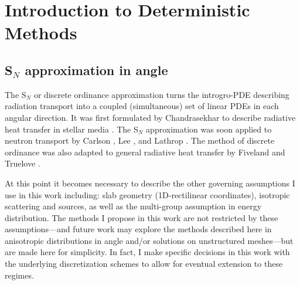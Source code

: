 

\chapter{Introduction to Deterministic Methods}

\label{chap:determ_intro}

\section{S$_N$ approximation in angle}

The S$_N$ or discrete ordinance approximation turns the introgro-PDE describing radiation transport into a coupled (simultaneous) set of linear PDEs in each angular direction.
It was first formulated by Chandrasekhar to describe radiative heat transfer in stellar media \cite{chandrasekhar1960radiative}.
The S$_N$ approximation was soon applied to neutron transport by Carlson \cite{precise1971carlson}, Lee \cite{discrete1961lee}, and Lathrop \cite{discrete1966lathnrop}.
The method of discrete ordinance was also adapted to general radiative heat transfer by Fiveland \cite{three1988fiveland} and Truelove \cite{discrete1987truelove}.

At this point it becomes necessary to describe the other governing assumptions I use in this work including:
slab geometry (1D-rectilinear coordinates), isotropic scattering and sources, as well as the multi-group assumption in energy distribution.
The methods I propose in this work are not restricted by these assumptions---and future work may explore the methods described here in anisotropic distributions in angle and/or solutions on unstructured meshes---but are made here for simplicity.
In fact, I make specific decisions in this work with the underlying discretization schemes to allow for eventual extension to these regimes.

